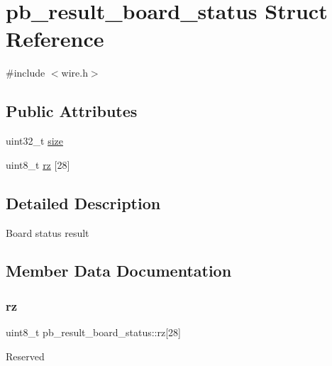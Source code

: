 \hypertarget{structpb__result__board__status}{}\section{pb\+\_\+result\+\_\+board\+\_\+status Struct Reference}
\label{structpb__result__board__status}


{\ttfamily \#include $<$wire.\+h$>$}

\subsection*{Public Attributes}
\begin{DoxyCompactItemize}
\item 
uint32\+\_\+t \hyperlink{structpb__result__board__status_afcbf35c339a827ecb018c7e6f09eb0c6}{size}
\item 
uint8\+\_\+t \hyperlink{structpb__result__board__status_aeb4858ab69adb045a7e35e637dfcee25}{rz} \mbox{[}28\mbox{]}
\end{DoxyCompactItemize}


\subsection{Detailed Description}
Board status result 

\subsection{Member Data Documentation}
\mbox{\label{structpb__result__board__status_aeb4858ab69adb045a7e35e637dfcee25}} 
\subsubsection{\texorpdfstring{rz}{rz}}
{\footnotesize\ttfamily uint8\+\_\+t pb\+\_\+result\+\_\+board\+\_\+status\+::rz\mbox{[}28\mbox{]}}

Reserved \mbox{\label{structpb__result__board__status_afcbf35c339a827ecb018c7e6f09eb0c6}} 
